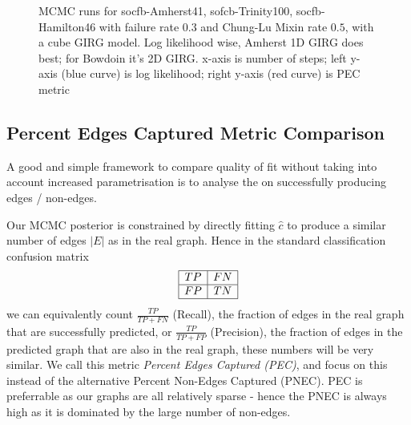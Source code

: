 \begin{figure}



  \caption{MCMC runs for socfb-Amherst41, sofcb-Trinity100, socfb-Hamilton46 with failure rate $0.3$ and Chung-Lu Mixin rate $0.5$, with a cube GIRG model. Log likelihood wise, Amherst 1D GIRG does best; for Bowdoin it's 2D GIRG.
  x-axis is number of steps; left y-axis (blue curve) is log likelihood; right y-axis (red curve) is PEC metric}
  \label{fig:mcmc_runs}
\end{figure}

\subsection{Percent Edges Captured Metric Comparison}
A good and simple framework to compare quality of fit without taking into account increased parametrisation is to analyse the  on successfully producing edges / non-edges.

Our MCMC posterior is constrained by directly fitting $\hat{c}$ to produce a similar number of edges $|E|$ as in the real graph. Hence in the standard classification confusion matrix
\begin{equation}
  \begin{array}{|c|c|}
    \hline
    TP & FN \\
    \hline
    FP & TN \\
    \hline
    \end{array}
\end{equation}
we can equivalently count $\frac{TP}{TP + FN}$ (Recall), the fraction of edges in the real graph that are successfully predicted, or $\frac{TP}{TP + FP}$ (Precision), the fraction of edges in the predicted graph that are also in the real graph, these numbers will be very similar. We call this metric \textit{Percent Edges Captured (PEC)}, and focus on this instead of the alternative Percent Non-Edges Captured (PNEC). PEC is preferrable as our graphs are all relatively sparse - hence the PNEC is always high as it is dominated by the large number of non-edges.


